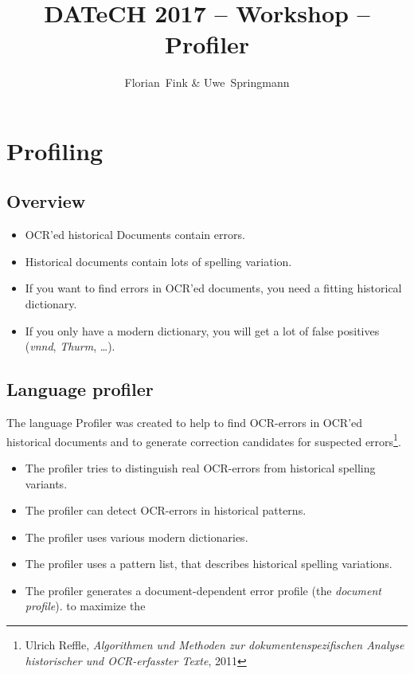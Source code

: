 
\title{DATeCH 2017 -- \pocoto{} Workshop -- Profiler}
\author{Florian~Fink \& Uwe~Springmann}



\begin{frame}
	\titlepage
\end{frame}

\section{Profiling}
\subsection{Overview}
\begin{frame}
	\begin{itemize}
		\item OCR'ed historical Documents contain errors.
		\item Historical documents contain lots of spelling variation.
		\item If you want to find errors in OCR'ed documents, you need a fitting
			historical dictionary.
		\item If you only have a modern dictionary, you will get a lot of false
			positives (\emph{vnnd}, \emph{Thurm}, \dots).
	\end{itemize}
\end{frame}

\subsection{Language profiler}
\begin{frame}
	The language Profiler was created to help to find OCR-errors in OCR'ed
	historical documents and to generate correction candidates for suspected
	errors\footnote{Ulrich Reffle, \emph{Algorithmen und Methoden zur
	dokumentenspezifischen Analyse historischer und OCR-erfasster Texte}, 2011}.

	\begin{itemize}
		\item The profiler tries to distinguish real OCR-errors from historical
			spelling variants.
		\item The profiler can detect OCR-errors in historical patterns.
		\item The profiler uses various modern dictionaries.
		\item The profiler uses a pattern list, that describes
			historical spelling variations.
		\item The profiler generates a document-dependent error profile (the
			\emph{document profile}).%
			to maximize the
	\end{itemize}
\end{frame}

